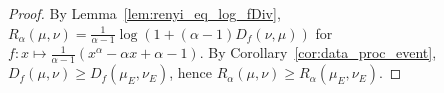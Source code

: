 \begin{proof}
By Lemma~\ref{lem:renyi_eq_log_fDiv}, $R_\alpha(\mu, \nu) = \frac{1}{\alpha - 1} \log (1 + (\alpha - 1) D_f(\nu, \mu))$ for $f : x \mapsto \frac{1}{\alpha - 1}(x^{\alpha} - \alpha x + \alpha - 1)$.
By Corollary~\ref{cor:data_proc_event}, $D_f(\mu, \nu) \ge D_f(\mu_E, \nu_E)$, hence $R_\alpha(\mu, \nu) \ge R_\alpha(\mu_E, \nu_E)$.
\end{proof}
